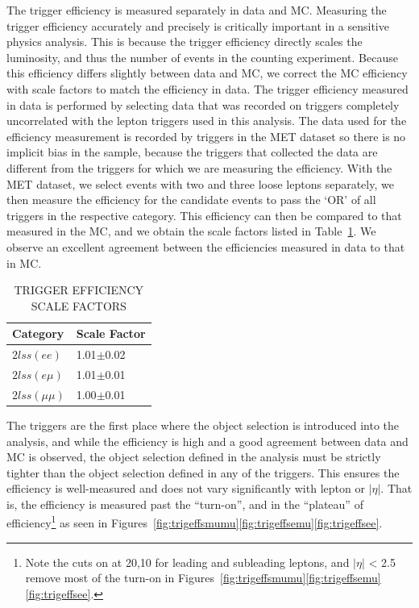 The trigger efficiency is measured separately in data and MC. Measuring the trigger efficiency accurately and precisely is critically
important in a sensitive physics analysis. This is because the trigger efficiency directly scales the luminosity, and thus the number
of events in the counting experiment.
Because this efficiency differs slightly between data and MC, we correct the MC efficiency with scale factors to match the
efficiency in data. The trigger efficiency measured in data is performed by selecting data that was recorded on triggers completely
uncorrelated with the lepton triggers used in this analysis. The data used for the efficiency measurement is recorded by triggers in
the MET dataset so there is no implicit bias in the sample, because the triggers that collected the data are different from the triggers
for which we are measuring the efficiency. With the MET dataset, we select events with two and three loose leptons separately, we then measure
the efficiency for the candidate events to pass the `OR' of all triggers in the respective category. This efficiency can then be compared
to that measured in the MC, and we obtain the scale factors listed in Table~\ref{tab:trigger_sf}. We observe an excellent agreement between
the efficiencies measured in data to that in MC. 


\begin{table}[hbtp]
\centering
\caption[TRIGGER EFFICIENCY SCALE FACTORS]{TRIGGER EFFICIENCY SCALE FACTORS}
\begin{tabular}{l|l}
\hline
Category & Scale Factor \\
\hline
$2lss (ee)$ & 1.01$\pm$0.02 \\
$2lss (e\mu)$ & 1.01$\pm$0.01 \\
$2lss (\mu\mu)$ & 1.00$\pm$0.01 \\
\hline
\end{tabular}
\label{tab:trigger_sf}
\end{table}

The triggers are the first place where the object selection is introduced into the analysis, and while the efficiency is high
and a good agreement between data and MC is observed,
the object selection defined in the analysis must be strictly tighter than the object selection defined in any of the triggers. This ensures
the efficiency is well-measured and does not vary significantly with lepton \pt or $|\eta|$. That is, the efficiency is measured past the ``turn-on'',
and in the ``plateau'' of efficiency\footnote{Note the cuts on \pt at 20,10 for leading and subleading leptons, and $|\eta|$ < 2.5 remove most
of the turn-on in Figures~\ref{fig:trigeffsmumu}\ref{fig:trigeffsemu}\ref{fig:trigeffsee}.}
as seen in Figures~\ref{fig:trigeffsmumu}\ref{fig:trigeffsemu}\ref{fig:trigeffsee}. 

